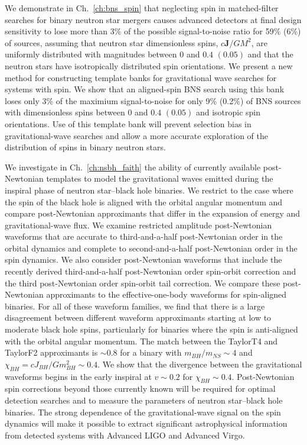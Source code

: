 We demonstrate in Ch.~\ref{ch:bns_spin} that neglecting spin in matched-filter searches for binary
neutron star mergers causes advanced detectors at final design sensitivity
to lose more than 3\% of the possible signal-to-noise ratio for 59\% (6\%) of
sources, assuming that neutron star dimensionless spins, $c\mathbf{J}/GM^2$, are uniformly distributed
with magnitudes between $0$ and $0.4$ $(0.05)$ and that the neutron stars
have isotropically distributed spin orientations.
We present a new method for constructing template banks for gravitational
wave searches for systems with spin. We 
show that an aligned-spin BNS search using this bank loses only
3\% of the maximium signal-to-noise for only 9\% (0.2\%)
of BNS sources with dimensionless spins between $0$ and $0.4$ $(0.05)$ 
and isotropic spin orientations. Use of this
template bank will prevent selection bias in gravitational-wave searches and
allow a more accurate exploration of the distribution of spins in binary
neutron stars.

We investigate in Ch.~\ref{ch:nsbh_faith} the ability of currently available
post-Newtonian templates to model the gravitational waves emitted during the
inspiral phase of neutron star--black hole binaries. We restrict to the case where the spin of the
black hole is aligned with the orbital angular momentum and compare
post-Newtonian approximants that differ in the expansion of energy and gravitational-wave flux. We examine
restricted amplitude post-Newtonian waveforms that are accurate to
third-and-a-half post-Newtonian order in the orbital dynamics and complete to second-and-a-half post-Newtonian order
in the spin dynamics. We also consider post-Newtonian waveforms that include the recently derived third-and-a-half
post-Newtonian order spin-orbit correction and the third post-Newtonian order spin-orbit tail correction. 
We compare these post-Newtonian approximants to the effective-one-body waveforms for spin-aligned binaries.
For all of these waveform families, we find that
 there is a large disagreement between
different waveform approximants starting at low to moderate black hole spins,
particularly for binaries where the spin is anti-aligned with the orbital
angular momentum. The match between the TaylorT4 and TaylorF2 approximants is $\sim 0.8$ for a binary with $m_{BH}/m_{NS} \sim 4$ and 
$\chi_{BH} = cJ_{BH}/Gm^2_{BH} \sim 0.4$.
We show that the divergence between the gravitational waveforms begins in the early
inspiral at $v \sim 0.2$ for $\chi_{BH} \sim 0.4$.  Post-Newtonian spin corrections beyond those currently
known will be required for optimal detection searches and to measure the
parameters of neutron star--black hole binaries. The strong dependence of 
the gravitational-wave signal on the spin dynamics will make it possible to extract significant
astrophysical information from detected systems with Advanced LIGO and
Advanced Virgo.

